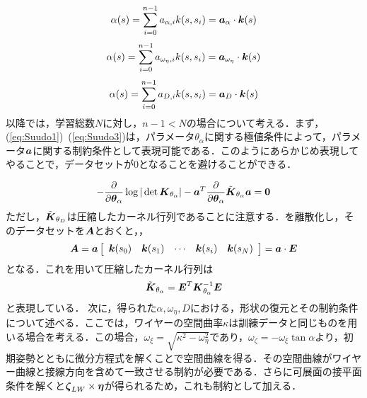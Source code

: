 \documentclass[11pt]{jsarticle}
\begin{document}
			\begin{equation}\label{eq:alpha_eq}
				\alpha(s) = \sum_{i=0}^{n-1} a_{\alpha,i} k(s,s_i) = \boldsymbol{a}_{\alpha} \cdot \boldsymbol{k}(s)
			\end{equation}
			\begin{equation}\label{eq:omgEta_eq}
			\alpha(s) = \sum_{i=0}^{n-1} a_{\omega_{\eta},i} k(s,s_i) = \boldsymbol{a}_{\omega_{\eta}} \cdot \boldsymbol{k}(s)
			\end{equation}
			\begin{equation}\label{eq:Dist_eq}
			\alpha(s) = \sum_{i=0}^{n-1} a_{D,i} k(s,s_i) = \boldsymbol{a}_{D} \cdot \boldsymbol{k}(s)
			\end{equation}
			以降では，学習総数$ N $に対し，$ n-1<N $の場合について考える．まず，(\ref{eq:Suudo1})~(\ref{eq:Suudo3})は，パラメータ$ \theta_{\alpha} $に関する極値条件によって，パラメータ$ \boldsymbol{a} $に関する制約条件として表現可能である．このようにあらかじめ表現してやることで，データセットが0となることを避けることができる．
			
			\begin{equation}\label{eq:alpha_const1}
				-\frac{\partial }{\partial \boldsymbol{\theta}_{\alpha}}\log|\det \boldsymbol{K}_{\theta_{\alpha}}| - \boldsymbol{a}^T \frac{\partial }{\partial \boldsymbol{\theta}_{\alpha}} \tilde{\boldsymbol{K}}_{\theta_{\alpha}} \boldsymbol{a} = \boldsymbol{0}
			\end{equation}
			ただし，$ \tilde{\boldsymbol{K}}_{\theta_{D}} $は圧縮したカーネル行列であることに注意する．を離散化し，そのデータセットを$ \boldsymbol{A} $とおくと，，
			\begin{equation}
				\boldsymbol{A} = \boldsymbol{a} \left[\begin{array}{ccccc}
					\boldsymbol{k}(s_0) & \boldsymbol{k}(s_1) & \cdots & \boldsymbol{k}(s_i) & \boldsymbol{k}(s_N)
				\end{array} \right]= \boldsymbol{a} \cdot \boldsymbol{E}
			\end{equation}
			となる．これを用いて圧縮したカーネル行列は
			\begin{equation}\label{eq:Kernel2}
				\tilde{\boldsymbol{K}}_{\theta_{\alpha}} =  \boldsymbol{E}^T \boldsymbol{K}_{\theta_{\alpha}}^{-1} \boldsymbol{E}
			\end{equation}
			と表現している．
			次に，得られた$ \alpha,\omega_{\eta},D $における，形状の復元とその制約条件について述べる．ここでは，ワイヤーの空間曲率$ \kappa $は訓練データと同じものを用いる場合を考える．この場合，$ \omega_{\xi} =\sqrt{\kappa^2-\omega_{\eta}^2}$であり，$ \omega_{\zeta}=-\omega_{\xi} \tan \alpha $より，初期姿勢とともに微分方程式を解くことで空間曲線を得る．その空間曲線がワイヤー曲線と接線方向を含めて一致させる制約が必要である．さらに可展面の接平面条件を解くと$ \boldsymbol{\zeta}_{LW} \times \boldsymbol{\eta} $が得られるため，これも制約として加える．
			
\end{document}
